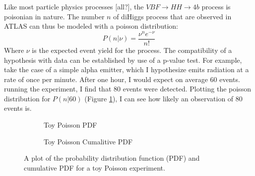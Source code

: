     Like most particle physics processes [all?], the $VBF \to HH \to 4b$ process is poisonian in nature.
    The number $n$ of diHiggs process that are observed in ATLAS can thus be modeled with a poisson distribution:
    \begin{equation}
        P(n|\nu) = \frac{ \nu^n e^{-\nu} }{n!}
    \end{equation}
    Where $\nu$ is the expected event yield for the process.
    The compatibility of a hypothesis with data can be established by use of a p-value test.
    For example, take the case of a simple alpha emitter,
        which I hypothesize emits radiation at a rate of once per minute.
    After one hour, I would expect on average 60 events.
    running the experiment, I find that 80 events were detected.
    Plotting the poisson distribution for $P(n|60)$ (Figure \ref{fig:poisson_toy_sig:pdf}),
        I can see how likely an observation of 80 events is.

    \begin{figure} %
        \centering
        \begin{subfigure}{0.4\textwidth} 
             
            \caption{Toy Poisson PDF}
            \label{fig:poisson_toy_sig:pdf}
        \end{subfigure}
        \begin{subfigure}{0.4\textwidth}
             
            \caption{Toy Poisson Cumalitive PDF}
            \label{fig:poisson_toy_sig:Cpdf}
        \end{subfigure}
        \caption{
            A plot of the probability distribution function (PDF)
                and cumulative PDF for a toy Poisson experiment.
        }
    \end{figure}


